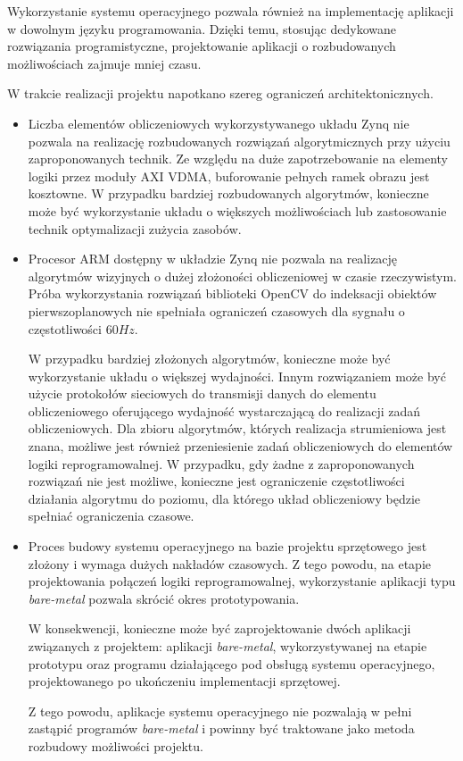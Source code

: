 Wykorzystanie systemu operacyjnego pozwala również na implementację aplikacji w dowolnym języku programowania. 
Dzięki temu, stosując dedykowane rozwiązania programistyczne, projektowanie aplikacji o rozbudowanych możliwościach zajmuje mniej czasu.

W trakcie realizacji projektu napotkano szereg ograniczeń architektonicznych. %
\begin{itemize}
	\item Liczba elementów obliczeniowych wykorzystywanego układu Zynq nie pozwala na realizację rozbudowanych rozwiązań algorytmicznych przy użyciu zaproponowanych technik. 
	Ze względu na duże zapotrzebowanie na elementy logiki przez moduły AXI VDMA, buforowanie pełnych ramek obrazu jest kosztowne. 
	W przypadku bardziej rozbudowanych algorytmów, konieczne może być wykorzystanie układu o większych możliwościach lub zastosowanie technik optymalizacji zużycia zasobów.
	
	\item Procesor ARM dostępny w układzie Zynq nie pozwala na realizację algorytmów wizyjnych o dużej złożoności obliczeniowej w  czasie rzeczywistym. 
	Próba wykorzystania rozwiązań biblioteki OpenCV do indeksacji obiektów pierwszoplanowych nie spełniała ograniczeń czasowych dla sygnału o częstotliwości $60Hz$.
	
	W przypadku bardziej złożonych algorytmów, konieczne może być wykorzystanie układu o większej wydajności. 
	Innym rozwiązaniem może być użycie protokołów sieciowych do transmisji danych do elementu obliczeniowego oferującego wydajność wystarczającą do realizacji zadań obliczeniowych. 
	Dla zbioru algorytmów, których realizacja strumieniowa jest znana, możliwe jest również przeniesienie zadań obliczeniowych do elementów logiki reprogramowalnej. 
	W przypadku, gdy żadne z zaproponowanych rozwiązań nie jest możliwe, konieczne jest ograniczenie częstotliwości działania algorytmu do poziomu, dla którego układ obliczeniowy będzie spełniać ograniczenia czasowe.
	
	\item Proces budowy systemu operacyjnego na bazie projektu sprzętowego jest złożony i wymaga dużych nakładów czasowych. 
	Z tego powodu, na etapie projektowania połączeń logiki reprogramowalnej, wykorzystanie aplikacji typu \textit{bare-metal} pozwala skrócić okres prototypowania.
	
	W konsekwencji, konieczne może być zaprojektowanie dwóch aplikacji związanych z projektem: aplikacji \textit{bare-metal}, wykorzystywanej na etapie prototypu oraz programu działającego pod obsługą systemu operacyjnego, projektowanego po ukończeniu implementacji sprzętowej.
	
	Z tego powodu, aplikacje systemu operacyjnego nie pozwalają w pełni zastąpić programów \textit{bare-metal} i powinny być traktowane jako metoda rozbudowy możliwości projektu.
\end{itemize}

